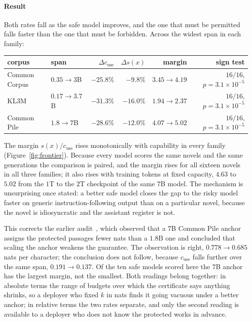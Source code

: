 \paragraph{Result}
Both rates fall as the safe model improves, and the one that must be permitted falls faster than
the one that must be forbidden. Across the widest span in each family:
\begin{center}\small
\begin{tabular}{@{}llrrrr@{}}
\toprule
corpus & span & $\Delta c_{\mathrm{use}}$ & $\Delta s(x)$ & margin & sign test \\
\midrule
Common Corpus & $0.35 \to 3$B   & $-25.8\%$ & $-9.8\%$  & $3.45 \to 4.19$ & $16/16$, $p = 3.1\times10^{-5}$ \\
KL3M          & $0.17 \to 3.7$B & $-31.3\%$ & $-16.0\%$ & $1.94 \to 2.37$ & $16/16$, $p = 3.1\times10^{-5}$ \\
Common Pile   & $1.8 \to 7$B    & $-28.6\%$ & $-12.0\%$ & $4.07 \to 5.02$ & $16/16$, $p = 3.1\times10^{-5}$ \\
\bottomrule
\end{tabular}
\end{center}
The margin $s(x)/c_{\mathrm{use}}$ rises monotonically with capability in every family
(Figure~\ref{fig:frontier}). Because every model scores the same novels and the same generations
the comparison is paired, and the margin rises for all sixteen novels in all three families; it
also rises with training tokens at fixed capacity, $4.63$ to $5.02$ from the $1$T to the $2$T
checkpoint of the same $7$B model. The mechanism is unsurprising once stated: a better safe model
closes the gap to the risky model faster on generic instruction-following output than on a
particular novel, because the novel is idiosyncratic and the assistant register is not.

This corrects the earlier audit~\citep{vijayavallabh2026audit}, which observed that a $7$B Common
Pile anchor assigns the protected passages fewer nats than a $1.8$B one and concluded that scaling
the anchor weakens the guarantee. The observation is right, $0.778 \to 0.685$ nats per character;
the conclusion does not follow, because $c_{\mathrm{use}}$ falls further over the same span,
$0.191 \to 0.137$. Of the ten safe models scored here the $7$B anchor has the largest margin, not
the smallest. Both readings belong together: in absolute terms the range of budgets over which the certificate
says anything shrinks, so a deployer who fixed $k$ in nats finds it going vacuous under a better
anchor; in relative terms the two rates separate, and only the second reading is available to a
deployer who does not know the protected works in advance.


